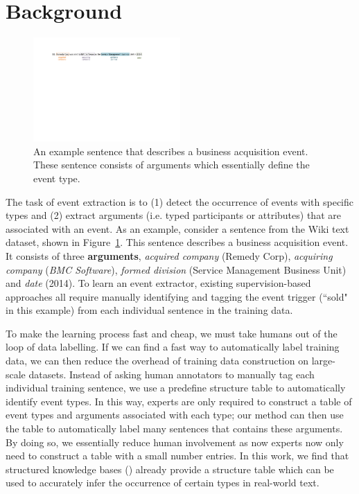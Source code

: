\section{Background}
\begin{figure}
  \centering
  \includegraphics[width=0.5\textwidth]{figs/example.pdf}
  \caption{An example sentence that describes a business acquisition event. These sentence consists of arguments which essentially define
  the event type.}
  \label{fig:example}
\end{figure}


The task of event extraction is to (1) detect the occurrence of events with specific types and (2) extract arguments (i.e. typed
participants or attributes) that are associated with an event. As an example, consider a sentence from the Wiki text dataset, shown in
Figure~\ref{fig:example}. This sentence describes a business acquisition event. It consists of three \textbf{arguments}, \emph{acquired
company} (Remedy Corp), \emph{acquiring company} (\emph{BMC Software}), \emph{formed division} (Service Management Business Unit) and
\emph{date} (2014). To learn an event extractor, existing supervision-based approaches all require manually identifying and tagging the
event trigger (``sold" in this example) from each individual sentence in the training data.


To make the learning process fast and cheap, we must take humans out of the loop of data labelling. If we can find a fast way to
automatically label training data, we can then reduce the overhead of training data construction on large-scale datasets. Instead of asking
human annotators to manually tag each individual training sentence, we use a predefine structure table to automatically identify event
types. In this way, experts are only required to construct a table of event types and arguments associated with each type; our method can
then use the table to automatically label many sentences that contains these arguments. By doing so, we essentially reduce human
involvement as now experts now only need to construct a table with a small number entries.   In this work, we find that structured  knowledge bases (\KB) already provide a structure table which can be used to
accurately infer the occurrence of certain types in real-world text.



